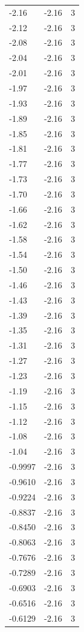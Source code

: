 \begin{longtable}{lrr}
  -2.16 & -2.16 & 3 \\
  -2.12 & -2.16 & 3 \\
  -2.08 & -2.16 & 3 \\
  -2.04 & -2.16 & 3 \\
  -2.01 & -2.16 & 3 \\
  -1.97 & -2.16 & 3 \\
  -1.93 & -2.16 & 3 \\
  -1.89 & -2.16 & 3 \\
  -1.85 & -2.16 & 3 \\
  -1.81 & -2.16 & 3 \\
  -1.77 & -2.16 & 3 \\
  -1.73 & -2.16 & 3 \\
  -1.70 & -2.16 & 3 \\
  -1.66 & -2.16 & 3 \\
  -1.62 & -2.16 & 3 \\
  -1.58 & -2.16 & 3 \\
  -1.54 & -2.16 & 3 \\
  -1.50 & -2.16 & 3 \\
  -1.46 & -2.16 & 3 \\
  -1.43 & -2.16 & 3 \\
  -1.39 & -2.16 & 3 \\
  -1.35 & -2.16 & 3 \\
  -1.31 & -2.16 & 3 \\
  -1.27 & -2.16 & 3 \\
  -1.23 & -2.16 & 3 \\
  -1.19 & -2.16 & 3 \\
  -1.15 & -2.16 & 3 \\
  -1.12 & -2.16 & 3 \\
  -1.08 & -2.16 & 3 \\
  -1.04 & -2.16 & 3 \\
  -0.9997 & -2.16 & 3 \\
  -0.9610 & -2.16 & 3 \\
  -0.9224 & -2.16 & 3 \\
  -0.8837 & -2.16 & 3 \\
  -0.8450 & -2.16 & 3 \\
  -0.8063 & -2.16 & 3 \\
  -0.7676 & -2.16 & 3 \\
  -0.7289 & -2.16 & 3 \\
  -0.6903 & -2.16 & 3 \\
  -0.6516 & -2.16 & 3 \\
  -0.6129 & -2.16 & 3 \\

\end{longtable}

